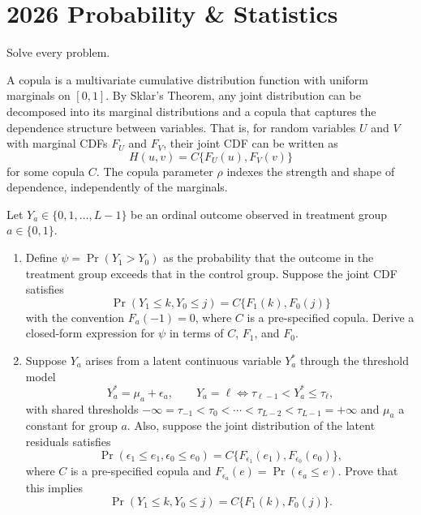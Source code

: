 \section{2026 Probability \& Statistics}

Solve every problem.

\begin{exercise}\label{probability:2026:1}
A copula is a multivariate cumulative distribution function with uniform marginals on $[0,1]$.
By Sklar's Theorem, any joint distribution can be decomposed into its marginal distributions and a copula that captures the dependence structure between variables. That is, for random variables $U$ and $V$ with marginal CDFs $F_U$ and $F_V$, their joint CDF can be written as
\[
H(u,v)=C\{F_U(u),F_V(v)\}
\]
for some copula $C$. The copula parameter $\rho$ indexes the strength and shape of dependence, independently of the marginals.

Let $Y_a\in\{0,1,\ldots,L-1\}$ be an ordinal outcome observed in treatment group $a\in\{0,1\}$.
\begin{enumerate}
    \item[(1)] Define $\psi=\Pr(Y_1>Y_0)$ as the probability that the outcome in the treatment group exceeds that in the control group. Suppose the joint CDF satisfies
    \[
    \Pr(Y_1\leq k,Y_0\leq j)=C\{F_1(k),F_0(j)\}
    \]
    with the convention $F_a(-1)=0$, where $C$ is a pre-specified copula. Derive a closed-form expression for $\psi$ in terms of $C$, $F_1$, and $F_0$.

    \item[(2)] Suppose $Y_a$ arises from a latent continuous variable $Y_a^*$ through the threshold model
    \[
    Y_a^*=\mu_a+\epsilon_a,\qquad
    Y_a=\ell \Longleftrightarrow \tau_{\ell-1}<Y_a^*\leq \tau_\ell,
    \]
    with shared thresholds $-\infty=\tau_{-1}<\tau_0<\cdots<\tau_{L-2}<\tau_{L-1}=+\infty$ and $\mu_a$ a constant for group $a$. Also, suppose the joint distribution of the latent residuals satisfies
    \[
    \Pr(\epsilon_1\leq e_1,\epsilon_0\leq e_0)
    =C\{F_{\epsilon_1}(e_1),F_{\epsilon_0}(e_0)\},
    \]
    where $C$ is a pre-specified copula and $F_{\epsilon_a}(e)=\Pr(\epsilon_a\leq e)$. Prove that this implies
    \[
    \Pr(Y_1\leq k,Y_0\leq j)=C\{F_1(k),F_0(j)\}.
    \]
\end{enumerate}
\end{exercise}


